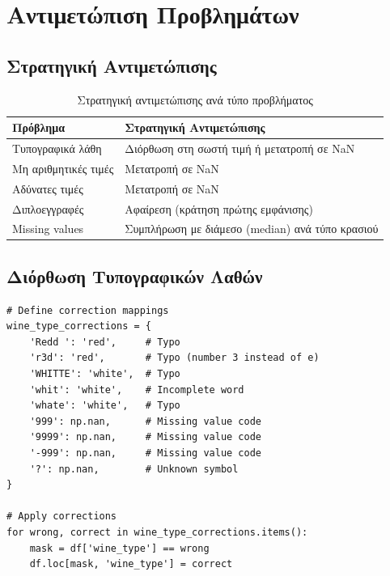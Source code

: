 \documentclass[12pt,a4paper]{article}
\begin{document}
\section{\textgreek{Αντιμετώπιση Προβλημάτων}}

\subsection{\textgreek{Στρατηγική Αντιμετώπισης}}

\begin{table}[H]
\centering
\caption{\textgreek{Στρατηγική αντιμετώπισης ανά τύπο προβλήματος}}
\label{tab:strategy}
\begin{tabular}{@{}lp{8cm}@{}}
\toprule
\textbf{\textgreek{Πρόβλημα}} & \textbf{\textgreek{Στρατηγική Αντιμετώπισης}} \\
\midrule
\textgreek{Τυπογραφικά λάθη} & \textgreek{Διόρθωση στη σωστή τιμή ή μετατροπή σε NaN} \\
\textgreek{Μη αριθμητικές τιμές} & \textgreek{Μετατροπή σε NaN} \\
\textgreek{Αδύνατες τιμές} & \textgreek{Μετατροπή σε NaN} \\
\textgreek{Διπλοεγγραφές} & \textgreek{Αφαίρεση (κράτηση πρώτης εμφάνισης)} \\
Missing values & \textgreek{Συμπλήρωση με διάμεσο (median) ανά τύπο κρασιού} \\
\bottomrule
\end{tabular}
\end{table}

\subsection{\textgreek{Διόρθωση Τυπογραφικών Λαθών}}

\begin{lstlisting}[caption={Fix typos}]
# Define correction mappings
wine_type_corrections = {
    'Redd ': 'red',     # Typo
    'r3d': 'red',       # Typo (number 3 instead of e)
    'WHITTE': 'white',  # Typo
    'whit': 'white',    # Incomplete word
    'whate': 'white',   # Typo
    '999': np.nan,      # Missing value code
    '9999': np.nan,     # Missing value code
    '-999': np.nan,     # Missing value code
    '?': np.nan,        # Unknown symbol
}

# Apply corrections
for wrong, correct in wine_type_corrections.items():
    mask = df['wine_type'] == wrong
    df.loc[mask, 'wine_type'] = correct
\end{lstlisting}
\end{document}
